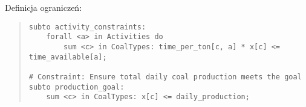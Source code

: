 Definicja ograniczeń:
\begin{quote}
\begin{verbatim}
subto activity_constraints:
    forall <a> in Activities do
        sum <c> in CoalTypes: time_per_ton[c, a] * x[c] <= time_available[a];

# Constraint: Ensure total daily coal production meets the goal
subto production_goal:
    sum <c> in CoalTypes: x[c] <= daily_production;
\end{verbatim}
\end{quote}